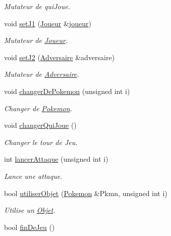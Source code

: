 \begin{DoxyCompactItemize}
\begin{DoxyCompactList}\small\item\em Mutateur de qui\+Joue. \end{DoxyCompactList}\item 
void \hyperlink{class_combat_a7ff4ea33e3bafa37fd8f5a0754955b4f}{set\+J1} (\hyperlink{class_joueur}{Joueur} \&\hyperlink{class_combat_adfc70215a221f8a5071f7e435719f011}{joueur})
\begin{DoxyCompactList}\small\item\em Mutateur de \hyperlink{class_joueur}{Joueur}. \end{DoxyCompactList}\item 
void \hyperlink{class_combat_a2093b3be4975b62aa546d54f108834f3}{set\+J2} (\hyperlink{class_adversaire}{Adversaire} \&adversaire)
\begin{DoxyCompactList}\small\item\em Mutateur de \hyperlink{class_adversaire}{Adversaire}. \end{DoxyCompactList}\item 
void \hyperlink{class_combat_a567eab49812ecbd2d694e8cf064e800a}{changer\+De\+Pokemon} (unsigned int i)
\begin{DoxyCompactList}\small\item\em Changer de \hyperlink{class_pokemon}{Pokemon}. \end{DoxyCompactList}\item 
void \hyperlink{class_combat_a2848c91d76a09943dd5effb1904f1937}{changer\+Qui\+Joue} ()
\begin{DoxyCompactList}\small\item\em Changer le tour de Jeu. \end{DoxyCompactList}\item 
int \hyperlink{class_combat_a310a968bf21791e88753ca6c6a024d8d}{lancer\+Attaque} (unsigned int i)
\begin{DoxyCompactList}\small\item\em Lance une attaque. \end{DoxyCompactList}\item 
bool \hyperlink{class_combat_a3ab678df151ed9210806f89d1aeb47ab}{utiliser\+Objet} (\hyperlink{class_pokemon}{Pokemon} \&Pkmn, unsigned int i)
\begin{DoxyCompactList}\small\item\em Utilise un \hyperlink{class_objet}{Objet}. \end{DoxyCompactList}\item 
bool \hyperlink{class_combat_abbaadce2f31d9b12645481cc74a021b2}{fin\+De\+Jeu} ()

\end{DoxyCompactItemize}
